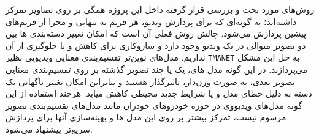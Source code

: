 روش‌های مورد بحث و بررسی قرار گرفته داخل این پروژه همگی بر روی تصاویر تمرکز داشته‌اند؛ به گونه‌ای که برای پردازش ویدیو، هر فریم به تنهایی و مجزا از فریم‌های پیشین پردازش می‌شود. چالش روش فعلی آن است که امکان تغییر دسته‌بندی ها بین دو تصویر متوالی در یک ویدیو وجود دارد و سازوکاری برای کاهش و یا جلو‌گیری از آن نداریم. مدل‌های نوین‌تر تقسیم‌بندی معنایی ویدیویی
نظیر 
\verb*|TMANET|
\cite{wang2021temporal}
به حل این مشکل می‌پردازند. در این گونه مدل های، یک یا چند تصویر گذشته بر روی تقسیم‌بندی معنایی تصویر بعدی، به صورت وزن‌دار، تاثیرگذار هستند و بنابراین امکان تغییر ناگهانی یک دسته به دلیل خطای مدل و یا شرایط جدید محیطی کاهش میابد. هرچند استفاده از این گونه مدل‌های ویدیووی در حوزه خودرو‌های خودران مانند مدل‌های تقسیم‌بندی تصویر مرسوم نیست، تمرکز بیشتر بر روی این مدل ها و بهینه‌سازی آنها برای پردازش سریع‌تر پیشنهاد می‌شود.
